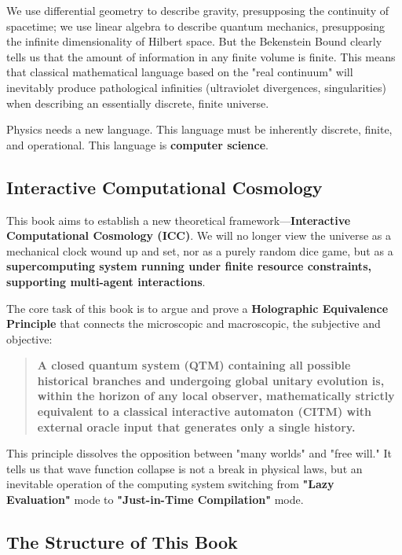 We use differential geometry to describe gravity, presupposing the continuity of spacetime; we use linear algebra to describe quantum mechanics, presupposing the infinite dimensionality of Hilbert space. But the Bekenstein Bound clearly tells us that the amount of information in any finite volume is finite. This means that classical mathematical language based on the "real continuum" will inevitably produce pathological infinities (ultraviolet divergences, singularities) when describing an essentially discrete, finite universe.

Physics needs a new language. This language must be inherently discrete, finite, and operational. This language is \textbf{computer science}.

\subsection*{Interactive Computational Cosmology}

This book aims to establish a new theoretical framework—\textbf{Interactive Computational Cosmology (ICC)}. We will no longer view the universe as a mechanical clock wound up and set, nor as a purely random dice game, but as a \textbf{supercomputing system running under finite resource constraints, supporting multi-agent interactions}.

The core task of this book is to argue and prove a \textbf{Holographic Equivalence Principle} that connects the microscopic and macroscopic, the subjective and objective:

\begin{quote}
\textbf{A closed quantum system (QTM) containing all possible historical branches and undergoing global unitary evolution is, within the horizon of any local observer, mathematically strictly equivalent to a classical interactive automaton (CITM) with external oracle input that generates only a single history.}
\end{quote}

This principle dissolves the opposition between "many worlds" and "free will." It tells us that wave function collapse is not a break in physical laws, but an inevitable operation of the computing system switching from \textbf{"Lazy Evaluation"} mode to \textbf{"Just-in-Time Compilation"} mode.

\subsection*{The Structure of This Book}


